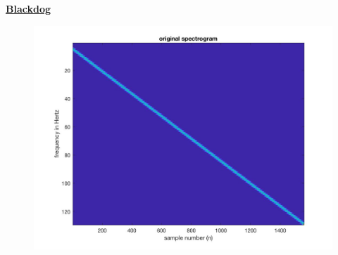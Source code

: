 \documentclass{article}
\begin{document}
\color{red}
\underline{\textbf{Blackdog}}
\color{black}
\begin{figure}[H]

\includegraphics[scale=.5]{Blackdog1}
\end{figure}
\end{document}
